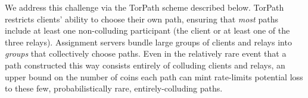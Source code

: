 We address this challenge via the TorPath scheme described below.
TorPath restricts clients' ability to choose their own path,
ensuring that {\em most} paths include at
least one non-colluding participant (the client or at least one of the three
relays). Assignment servers bundle large groups of clients and relays into {\em
groups} that collectively choose paths. Even in the relatively rare event that a
path constructed this way consists entirely of colluding clients and relays, an
upper bound on the number of coins each path can mint rate-limits potential loss
to these few, probabilistically rare, entirely-colluding paths.
